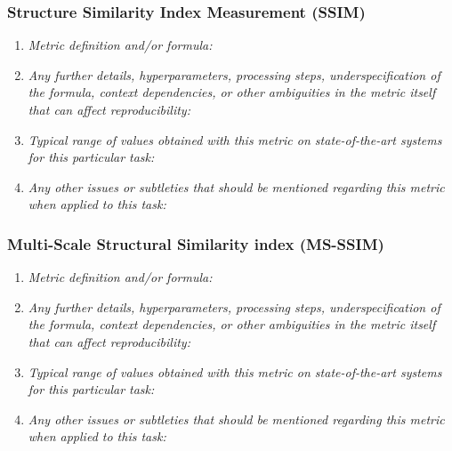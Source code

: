 \documentclass[a4paper,11pt]{article}
\begin{document}
        \subsubsection{Structure Similarity Index Measurement (SSIM)}
            \begin{enumerate}[label=\alph*.]
                \item \textit{Metric definition and/or formula:}
                \bigskip
                \item \textit{Any further details, hyperparameters, processing steps, underspecification of the formula, context dependencies, or other ambiguities in the metric itself that can affect reproducibility:}
                \bigskip
                \item \textit{Typical range of values obtained with this metric on state-of-the-art systems for this particular task:}
                \bigskip
                \item \textit{Any other issues or subtleties that should be mentioned regarding this metric when applied to this task:}
                \bigskip
            \end{enumerate}
        \subsubsection{Multi-Scale Structural Similarity index (MS-SSIM)}
            \begin{enumerate}[label=\alph*.]
                \item \textit{Metric definition and/or formula:}
                \bigskip
                \item \textit{Any further details, hyperparameters, processing steps, underspecification of the formula, context dependencies, or other ambiguities in the metric itself that can affect reproducibility:}
                \bigskip
                \item \textit{Typical range of values obtained with this metric on state-of-the-art systems for this particular task:}
                \bigskip
                \item \textit{Any other issues or subtleties that should be mentioned regarding this metric when applied to this task:}
                \bigskip
            \end{enumerate}
\end{document}
